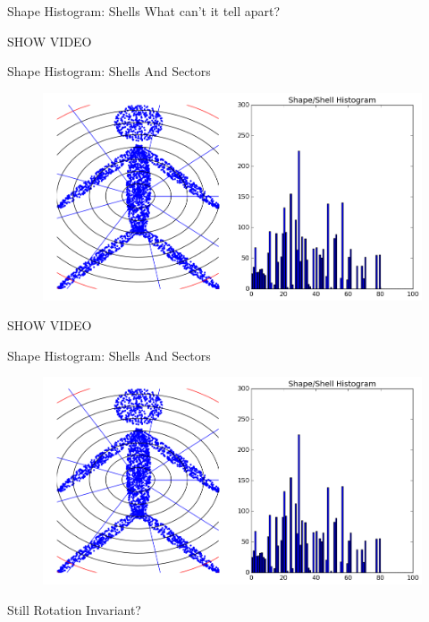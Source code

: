 \documentclass{beamer}
\begin{document}
\begin{frame}{Shape Histogram: Shells}
What can't it tell apart?

SHOW VIDEO

\end{frame}

\begin{frame}{Shape Histogram: Shells And Sectors}

\begin{figure}[t]
	\centering
    \includegraphics[width=\textwidth]{ShapeHistShellsSectors.png}
\end{figure}

SHOW VIDEO

\end{frame}

\begin{frame}{Shape Histogram: Shells And Sectors}

\begin{figure}[t]
	\centering
    \includegraphics[width=\textwidth]{ShapeHistShellsSectors.png}
\end{figure}

Still Rotation Invariant?

\end{frame}
\end{document}
